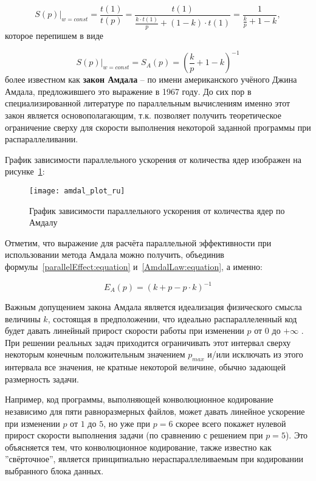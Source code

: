 \begin{equation}
    \left.S(p)\right|_{w = const} = \frac{t(1)}{t(p)} = \frac{t(1)}{{\displaystyle\frac{k \cdot t(1)}{p}} + (1 - k) \cdot t(1)} = \frac{1}{{\displaystyle\frac{k}{p}} + 1 - k},
\end{equation}
которое перепишем в виде

\begin{equation}
    \label{AmdalLaw:equation}
    \left.S(p)\right|_{w=const} = S_A(p) = \left(\frac{k}{p} + 1 - k\right)^{-1}
\end{equation}
более известном как \textbf{закон Амдала} – по имени американского учёного Джина Амдала, предложившего это выражение в 1967 году. До сих пор в специализированной литературе по параллельным вычислениям именно этот закон является основополагающим, т.к. позволяет получить теоретическое ограничение сверху для скорости выполнения некоторой заданной программы при распараллеливании.

График зависимости параллельного ускорения от количества ядер изображен на рисунке~\ref{GraphAmdalSFromP:image}:

\begin{figure}[H]
    \texttt{[image: amdal\_plot\_ru]}
    \caption{График зависимости параллельного ускорения от количества ядер по Амдалу}
    \label{GraphAmdalSFromP:image}
\end{figure}

Отметим, что выражение для расчёта параллельной эффективности при использовании метода Амдала можно получить, объединив формулы~\eqref{parallelEffect:equation} и~\eqref{AmdalLaw:equation}, а именно:


\begin{equation}
    E_A(p) = \left(k + p - p \cdot k\right)^{-1}
\end{equation}

Важным допущением закона Амдала является идеализация физического смысла величины $k$, состоящая в предположении, что идеально распараллеленный код будет давать линейный прирост скорости работы при изменении $p$ от $0$ до $+\infty$ . При решении реальных задач приходится ограничивать этот интервал сверху некоторым конечным положительным значением $p_{max}$ и/или исключать из этого интервала все значения, не кратные некоторой величине, обычно задающей размерность задачи.

Например, код программы, выполняющей конволюционное кодирование независимо для пяти равноразмерных файлов, может давать линейное ускорение при изменении $p$ от $1$ до $5$, но уже при $p=6$ скорее всего покажет нулевой прирост скорости выполнения задачи (по сравнению с решением при $p=5$). Это объясняется тем, что  конволюционное кодирование, также известно как ''свёрточное'', является принципиально нераспараллеливаемым при кодировании выбранного блока данных.

